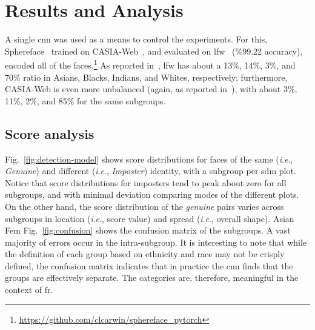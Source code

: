 \documentclass[10pt,twocolumn,letterpaper]{article}
\newcommand{\ie}{\textit{i}.\textit{e}., }
\begin{document}
\section{Results and Analysis}
A single \gls{cnn} was used as a means to control the experiments. For this, Sphereface~\cite{liu2017sphereface} trained on CASIA-Web~\cite{yi2014learning}, and evaluated on \gls{lfw}~\cite{LFWTech} (\%99.22 accuracy), encoded all of the faces.\footnote{\href{$https://github.com/clcarwin/sphereface\_pytorch$}{https://github.com/clcarwin/sphereface\_pytorch}} As reported in~\cite{wang2019racial}, \gls{lfw} has about a 13\%, 14\%, 3\%, and 70\% ratio in Asians, Blacks, Indians, and Whites, respectively; furthermore, CASIA-Web is even more unbalanced (again, as reported in~\cite{wang2019racial}), with about  3\%, 11\%, 2\%, and 85\% for the same subgroups.





\subsection{Score analysis}
Fig.~\ref{fig:detection-model} shows score distributions for faces of the same (\ie \emph{Genuine}) and different (\ie \emph{Imposter}) identity, with a subgroup per \gls{sdm} plot. Notice that score distributions for imposters tend to peak about zero for all subgroups, and with minimal deviation comparing modes of the different plots. On the other hand, the score distribution of the \emph{genuine} pairs varies across subgroups in location (\ie score value) and spread (\ie overall shape). Asian Fem
Fig.~\ref{fig:confusion} shows the confusion matrix of the subgroups. A vast majority of errors occur in the intra-subgroup. It is interesting to note that while the definition of  each group  based on ethnicity and race may not be crisply defined, the confusion matrix indicates that in practice the \gls{cnn} finds that the groups are effectively separate. The categories are, therefore, meaningful in the context of \gls{fr}.
\end{document}
